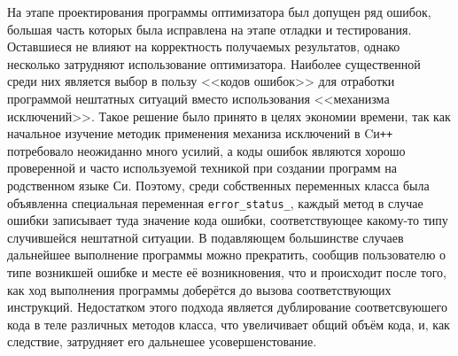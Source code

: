На этапе проектирования программы оптимизатора был допущен ряд ошибок,
большая часть которых была исправлена на этапе отладки и
тестирования. Оставшиеся не влияют на корректность получаемых
результатов, однако несколько затрудняют использование оптимизатора.
Наиболее существенной среди них является выбор в пользу <<кодов
ошибок>> для отработки программой нештатных ситуаций вместо
использования <<механизма исключений>>.  Такое решение было принято в целях
экономии времени, так как начальное изучение методик применения
механиза исключений в Cи\texttt{++} потребовало неожиданно много
усилий, а коды ошибок являются хорошо проверенной и часто используемой
техникой при создании программ на родственном языке Си. Поэтому, среди
собственных переменных класса была объявленна специальная переменная
\verb+error_status_+, каждый метод в случае ошибки записывает туда
значение кода ошибки, соответствующее какому-то типу случившейся
нештатной ситуации.  В подавляющем большинстве случаев дальнейшее
выполнение программы можно прекратить, сообщив пользователю о типе
возникшей ошибке и месте её возникновения, что и происходит после
того, как ход выполнения программы доберётся до вызова соответствующих
инструкций. Недостатком этого подхода является дублирование
соответсвуюшего кода в теле различных методов класса, что увеличивает
общий объём кода, и, как следствие, затрудняет его дальнешее
усовершенстование.

